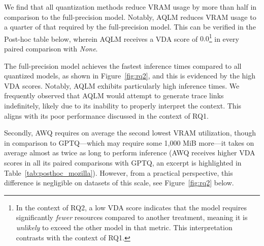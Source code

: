 \documentclass[conference]{IEEEtran}
\begin{document}
We find that all quantization methods reduce VRAM usage by more than half in comparison to the full-precision model. Notably, AQLM reduces VRAM usage to a quarter of that required by the full-precision model. This can be verified in the Post-hoc table below, wherein AQLM receives a VDA score of $0.0$\footnote{In the context of RQ2, a low VDA score indicates that the model requires significantly \textit{fewer} resources compared to another treatment, meaning it is \textit{unlikely} to exceed the other model in that metric. This interpretation contrasts with the context of RQ1.} in every paired comparison with \textit{None}. 

The full-precision model achieves the fastest inference times compared to all quantized models, as shown in Figure~\ref{fig:rq2}, and this is evidenced by the high VDA scores. Notably, AQLM exhibits particularly high inference times. We frequently observed that AQLM would attempt to generate trace links indefinitely, likely due to its inability to properly interpret the context. This aligns with its poor performance discussed in the context of RQ1.

Secondly, AWQ requires on average the second lowest VRAM utilization, though in comparison to GPTQ---which may require some 1,000 MiB more---it takes on average almost as twice as long to perform inference (AWQ receives higher VDA scores in all its paired comparisons with GPTQ, an excerpt is highlighted in Table~\ref{tab:posthoc_mozilla}). However, from a practical perspective, this difference is negligible on datasets of this scale, see Figure~\ref{fig:rq2} below. 

\begin{table}[ht]
    \centering
    \caption{Post-hoc Analysis: Mozilla dataset}
    \label{tab:posthoc_mozilla}
\end{table}
\end{document}

